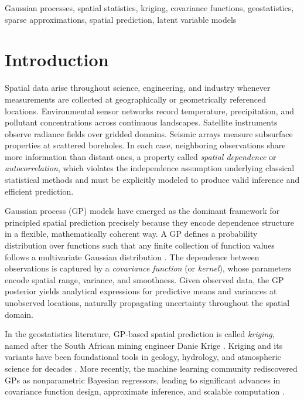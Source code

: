 \documentclass[conference]{IEEEtran}
\begin{document}
\begin{IEEEkeywords}
Gaussian processes, spatial statistics, kriging, covariance functions, geostatistics, sparse approximations, spatial prediction, latent variable models
\end{IEEEkeywords}

\section{Introduction}

Spatial data arise throughout science, engineering, and industry whenever measurements are collected at geographically or geometrically referenced locations. Environmental sensor networks record temperature, precipitation, and pollutant concentrations across continuous landscapes. Satellite instruments observe radiance fields over gridded domains. Seismic arrays measure subsurface properties at scattered boreholes. In each case, neighboring observations share more information than distant ones, a property called \emph{spatial dependence} or \emph{autocorrelation}, which violates the independence assumption underlying classical statistical methods and must be explicitly modeled to produce valid inference and efficient prediction.

Gaussian process (GP) models have emerged as the dominant framework for principled spatial prediction precisely because they encode dependence structure in a flexible, mathematically coherent way. A GP defines a probability distribution over functions such that any finite collection of function values follows a multivariate Gaussian distribution \cite{rasmussen2006gaussian}. The dependence between observations is captured by a \emph{covariance function} (or \emph{kernel}), whose parameters encode spatial range, variance, and smoothness. Given observed data, the GP posterior yields analytical expressions for predictive means and variances at unobserved locations, naturally propagating uncertainty throughout the spatial domain.

In the geostatistics literature, GP-based spatial prediction is called \emph{kriging}, named after the South African mining engineer Danie Krige \cite{krige1951statistical}. Kriging and its variants have been foundational tools in geology, hydrology, and atmospheric science for decades \cite{cressie1993statistics}. More recently, the machine learning community rediscovered GPs as nonparametric Bayesian regressors, leading to significant advances in covariance function design, approximate inference, and scalable computation \cite{rasmussen2006gaussian,quinonero2005unifying}.
\end{document}
